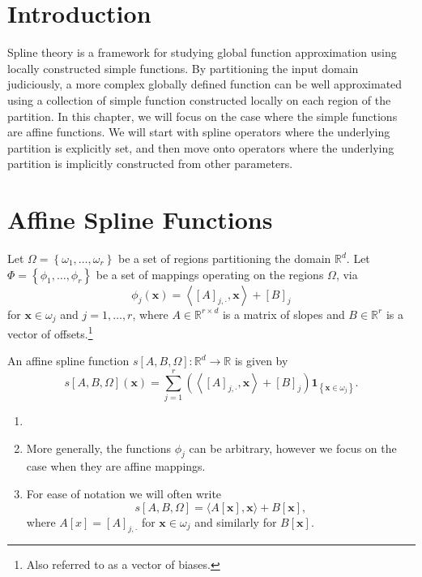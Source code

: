 \section{Introduction}

Spline theory is a framework for studying global function approximation using locally constructed simple functions. By partitioning the input domain judiciously, a more complex globally defined function can be well approximated using a collection of simple function constructed locally on each region of the partition. In this chapter, we will focus on the case where the simple functions are affine functions. We will start with spline operators where the underlying partition is explicitly set, and then move onto operators where the underlying partition is implicitly constructed from other parameters.

\section{Affine Spline Functions}

Let $\Omega=\left\{\omega_1,\dots,\omega_r\right\}$ be a set of regions partitioning the domain $\mathbb{R}^d$. Let $\Phi=\left\{\phi_1,\dots,\phi_r\right\}$ be a set of mappings operating on the regions $\Omega$, via $$\phi_j(\mathbf{x})=\left\langle[A]_{j,\cdot},\mathbf{x}\right\rangle+[B]_j$$for $\mathbf{x}\in\omega_j$ and $j=1,\dots,r$, where $A\in\mathbb{R}^{r\times d}$ is a matrix of slopes and $B\in\mathbb{R}^r$ is a vector of offsets.\footnote{Also referred to as a vector of biases.}

\begin{definition}
    An affine spline function $s[A,B,\Omega]:\mathbb{R}^d\to\mathbb{R}$ is given by $$s[A,B,\Omega](\mathbf{x})=\sum_{j=1}^r\left(\left\langle[A]_{j,\cdot},\mathbf{x}\right\rangle+\left[B\right]_j\right)\mathbf{1}_{\left\{\mathbf{x}\in\omega_j\right\}}.$$
\end{definition}

\begin{remark}\label{rem:affine_spline}
    \begin{enumerate}
        \item[]
        \item More generally, the functions $\phi_j$ can be arbitrary, however we focus on the case when they are affine mappings.
        \item For ease of notation we will often write $$s[A,B,\Omega]=\langle A[\mathbf{x}],\mathbf{x}\rangle+B[\mathbf{x}],$$where $A[x]=[A]_{j,\cdot}$ for $\mathbf{x}\in\omega_j$ and similarly for $B[\mathbf{x}]$.
    \end{enumerate}
\end{remark}

